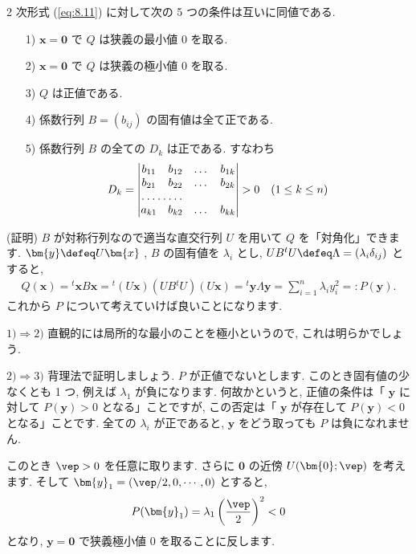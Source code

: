 \documentclass[openany, a4paper, oneside]{jsbook}
\begin{document}
\begin{thm}
2 次形式 (\ref{eq:8.11}) に対して次の 5 つの条件は互いに同値である.
\begin{enumerate}
\item[1)] $\bm{x} = \bm{0}$ で $Q$ は狭義の最小値 $0$ を取る.
\item[2)] $\bm{x} = \bm{0}$ で $Q$ は狭義の極小値 $0$ を取る.
\item[3)] $Q$ は正値である.
\item[4)] 係数行列 $B = (b_{ij})$ の固有値は全て正である.
\item[5)] 係数行列 $B$ の全ての $D_k$ は正である. すなわち
\begin{align}
D_k
=
\begin{vmatrix}
b_{11} & b_{12} & \dots & b_{1k} \\
b_{21} & b_{22} & \dots & b_{2k} \\
\hdotsfor{2} \\
a_{k1} & b_{k2} & \dots & b_{k k}
\end{vmatrix}
>
0 \quad (1 \leq k \leq n )
\end{align}
\end{enumerate}
\end{thm}
(証明)
$B$ が対称行列なので適当な直交行列 $U$ を用いて $Q$ を「対角化」できます.
$\bm{y} \defeq U\bm{x}$ ,
$B$ の固有値を $\lambda_i$ とし,
$U B {^t} U \defeq \Lambda = ( \lambda_i \delta_{ij} )$ とすると,
\begin{align}
Q ( \bm{x} )
=
{^t} \bm{x} B \bm{x}
=
{^t} ( U \bm{x} ) ( U B {^t} U ) ( U \bm{x} )
=
{^t} \bm{y} \Lambda \bm{y}
=
\sum_{i=1}^n \lambda_i y_i^2
=:
P ( \bm{y} ).
\end{align}
これから $P$ について考えていけば良いことになります.

$1)\Rightarrow 2)$
直観的には局所的な最小のことを極小というので, これは明らかでしょう.

$2)\Rightarrow 3)$
背理法で証明しましょう.
$P$ が正値でないとします. このとき固有値の少なくとも 1 つ, 例えば $\lambda_1$ が負になります.
何故かというと, 正値の条件は「 $\bm{y}$ に対して $P (\bm{y})>0$ となる」ことですが,
この否定は「 $\bm{y}$ が存在して $P (\bm{y})<0$ となる」ことです.
全ての $\lambda_i$ が正であると,  $\bm{y}$ をどう取っても $P$ は負になれません.

このとき $\vep>0$ を任意に取ります. さらに $\bm{0}$ の近傍 $U (\bm{0};\vep)$ を考えます.
そして $\bm{y}_1 = ( \vep/2 , 0 , \dotsb , 0 )$ とすると,
\begin{align}
P ( \bm{y}_1 )
=
\lambda_1  \left ( \frac{\vep} {2} \right) ^2
<
0
\end{align}
となり,  $\bm{y}=\bm{0}$ で狭義極小値 $0$ を取ることに反します.
\end{document}
